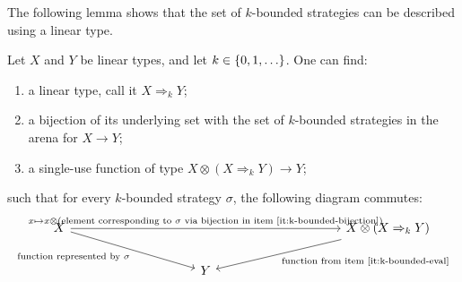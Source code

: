 The following lemma shows that the set of $k$-bounded strategies can be described using a linear type.

\begin{lemma}\label{lem:linear-type-of-k-bounded-strategies}
    Let $X$ and $Y$ be linear types, and let $k \in \{0,1,\ldots\}$. One can find: 
    \begin{enumerate}
        \item \label{it:k-bounded-type} a linear type, call it $X \Rightarrow_k Y$;
        \item \label{it:k-bounded-bijection} a bijection of its underlying set with the set of $k$-bounded strategies in the arena for $X \to Y$;
        \item \label{it:k-bounded-eval} a single-use function of type $X \otimes (X \Rightarrow_k Y) \to Y$;\end{enumerate}
    such that for every $k$-bounded strategy $\sigma$, the following diagram commutes:
    \[
    \begin{tikzcd}[column sep=3.5cm]
    X  
    \ar[rr,"{x \mapsto x \otimes \text{(element corresponding to $\sigma$ via bijection in item~\ref{it:k-bounded-bijection}})}"]
    \ar[dr,"{\text{function represented by $\sigma$}}"']
    & & 
    X \otimes (X \Rightarrow_k Y)
    \ar[dl,"\text{function from item~\ref{it:k-bounded-eval}}"]
    \\
    & Y
    \end{tikzcd}
    \]    
\end{lemma}




